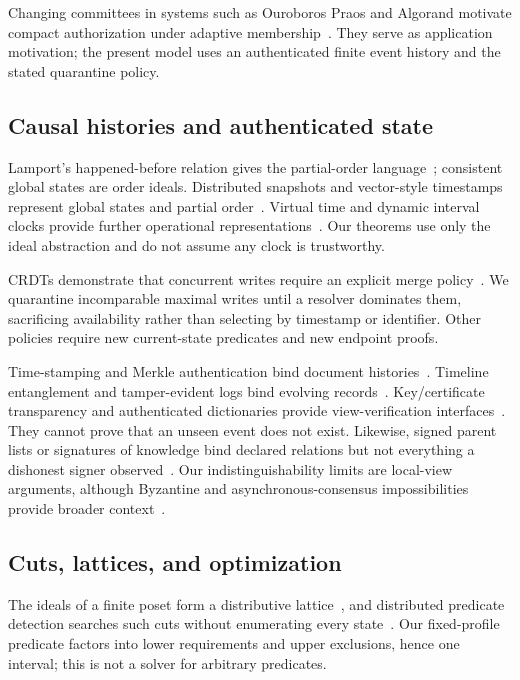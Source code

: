 \documentclass[11pt]{article}
\theoremstyle{definition}
\begin{document}
Changing committees in systems such as Ouroboros Praos and Algorand motivate compact authorization under adaptive membership~\cite{david2018praos,gilad2017algorand}.  They serve as application motivation; the present model uses an authenticated finite event history and the stated quarantine policy.

\subsection{Causal histories and authenticated state}
Lamport's happened-before relation gives the partial-order language~\cite{lamport1978time}; consistent global states are order ideals.  Distributed snapshots and vector-style timestamps represent global states and partial order~\cite{chandy1985snapshots,fidge1988timestamps}. Virtual time and dynamic interval clocks provide further operational representations~\cite{mattern1989virtual,almeida2008itc}.  Our theorems use only the ideal abstraction and do not assume any clock is trustworthy.

CRDTs demonstrate that concurrent writes require an explicit merge policy~\cite{shapiro2011crdt,baquero2017pure}.  We quarantine incomparable maximal writes until a resolver dominates them, sacrificing availability rather than selecting by timestamp or identifier.  Other policies require new current-state predicates and new endpoint proofs.

Time-stamping and Merkle authentication bind document histories~\cite{haber1991timestamp,bayer1993timestamp,merkle1990certified}. Timeline entanglement and tamper-evident logs bind evolving records~\cite{maniatis2002timeline,crosby2009logging}. Key/certificate transparency and authenticated dictionaries provide view-verification interfaces~\cite{melara2015coniks,laurie2013ct,goodrich2008outsourced}.  They cannot prove that an unseen event does not exist.  Likewise, signed parent lists or signatures of knowledge bind declared relations but not everything a dishonest signer observed~\cite{chase2006knowledge}.  Our indistinguishability limits are local-view arguments, although Byzantine and asynchronous-consensus impossibilities provide broader context~\cite{dolev1982byzantine,fischer1985consensus}.

\subsection{Cuts, lattices, and optimization}
The ideals of a finite poset form a distributive lattice~\cite{birkhoff1937rings,davey2002lattices}, and distributed predicate detection searches such cuts without enumerating every state~\cite{garg1995predicate}.  Our fixed-profile predicate factors into lower requirements and upper exclusions, hence one interval; this is not a solver for arbitrary predicates.
\end{document}
